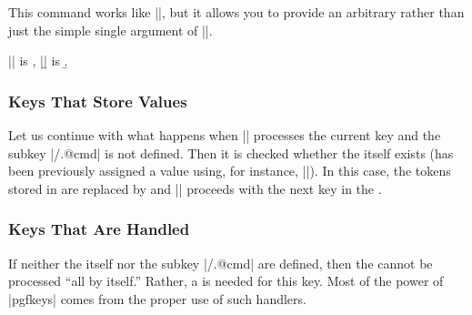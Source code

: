 
\begin{command}{\pgfkeysdefargs{}}
  This command works like |\pgfkeysdef|, but it allows you to provide
  an arbitrary  rather than just the simple
  single argument of |\pgfkeysdef|. 

\begin{codeexample}[]

|\a| is \a, |\b| is \b.
\end{codeexample}
\end{command}



\subsubsection{Keys That Store Values}

Let us continue with what happens when |\pgfkeys| processes the
current key and  the subkey |/.@cmd| is not defined. Then
it is checked whether the  itself exists (has been
previously assigned a value using, for instance,
|\pgfkeyssetvalue|). In this case, the tokens stored in  are
replaced by  and |\pgfkeys| proceeds with the next key in
the . 


\subsubsection{Keys That Are Handled}
\label{section-key-handlers}

If neither the  itself nor the subkey |/.@cmd| are
defined, then the  cannot be processed ``all by itself.''
Rather, a  is needed for this key. Most of the power of
|pgfkeys| comes from the proper use of such handlers.

